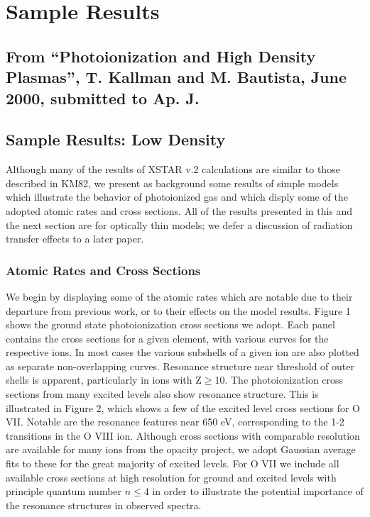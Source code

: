\chapter{Sample Results}

\section{From ``Photoionization and High Density Plasmas'', 
T. Kallman and M. Bautista, June 2000, submitted to Ap. J.}


\section{ Sample Results: Low Density }

Although many of the results of XSTAR v.2 calculations are similar to those 
described in KM82, we present as background some results of 
simple models which illustrate the behavior of photoionized 
gas and which disply some of the adopted atomic rates and cross sections.
All of the results presented in this and the next section are for 
optically thin models; we defer a discussion of radiation transfer 
effects to a later paper.

\subsection{Atomic Rates and Cross Sections}

We begin by displaying some of the atomic rates 
which are notable due to their departure from previous work, or to 
their effects on the model results.
Figure 1 shows the ground state photoionization cross sections we adopt.
Each panel contains the cross sections for a given element, with various 
curves for the respective ions.  In most cases the various subshells of 
a given ion are also plotted as separate non-overlapping curves.  Resonance 
structure near threshold of outer shells is apparent, particularly in ions 
with Z$\geq$10.  The photoionization cross sections from many excited levels 
also show resonance structure.  This is illustrated in Figure 2, 
which shows a few of the excited level cross sections for O VII.  Notable are the 
resonance features near 650 eV, corresponding to the 1-2 transitions in the 
O VIII ion.  Although cross sections with comparable resolution are available 
for many ions from the opacity project, we adopt Gaussian average fits 
to these for the great majority of excited levels.  For O VII we include all 
available cross sections at high resolution for ground and excited levels 
with principle quantum number $n \leq$4 in order to illustrate the 
potential importance of the resonance structures in observed spectra.

